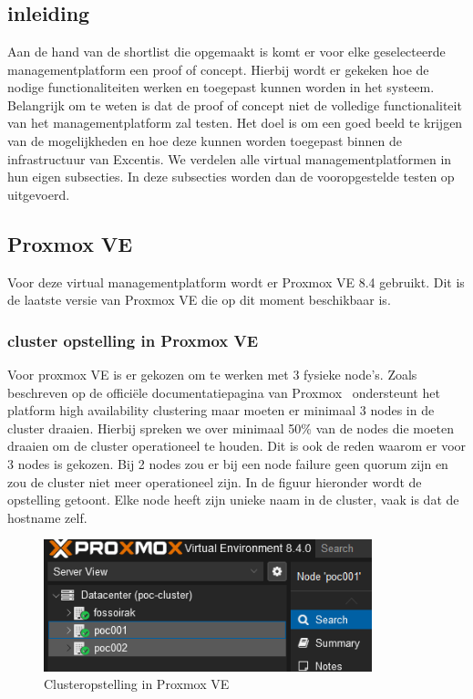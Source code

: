 
\chapter{}%
\label{ch:poc}

\section{inleiding}%
Aan de hand van de shortlist die opgemaakt is komt er voor elke geselecteerde managementplatform een proof of concept. Hierbij wordt er gekeken hoe de nodige functionaliteiten werken en toegepast kunnen worden in het systeem.
Belangrijk om te weten is dat de proof of concept niet de volledige functionaliteit van het managementplatform zal testen. Het doel is om een goed beeld te krijgen van de mogelijkheden en hoe deze kunnen worden toegepast binnen de infrastructuur van Excentis. 
We verdelen alle virtual managementplatformen in hun eigen subsecties. In deze subsecties worden dan de vooropgestelde testen op uitgevoerd.
\section{Proxmox VE}%

Voor deze virtual managementplatform wordt er Proxmox VE 8.4 gebruikt. Dit is de laatste versie van Proxmox VE die op dit moment beschikbaar is.
\subsection{cluster opstelling in Proxmox VE}
Voor proxmox VE is er gekozen om te werken met 3 fysieke node's. Zoals beschreven op de officiële documentatiepagina van Proxmox~\cite{proxmoxHA} ondersteunt het platform high availability clustering maar moeten er minimaal 3 nodes in de cluster draaien.
Hierbij spreken we over minimaal 50\% van de nodes die moeten draaien om de cluster operationeel te houden. Dit is ook de reden waarom er voor 3 nodes is gekozen. Bij 2 nodes zou er bij een node failure geen quorum zijn en zou de cluster niet meer operationeel zijn.
In de figuur hieronder wordt de opstelling getoont. Elke node heeft zijn unieke naam in de cluster, vaak is dat de hostname zelf.
\begin{figure}[H]
  \centering
  \includegraphics[width=0.85\textwidth]{../poc/cluster-info-prox.png}
  \caption{Clusteropstelling in Proxmox VE}
  \label{fig:cluster-proxmox}
\end{figure}
